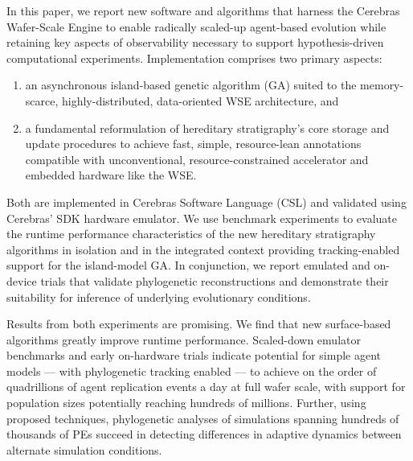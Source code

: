 In this paper, we report new software and algorithms that harness the Cerebras Wafer-Scale Engine to enable radically scaled-up agent-based evolution while retaining key aspects of observability necessary to support hypothesis-driven computational experiments.
Implementation comprises two primary aspects:
\begin{enumerate}
  \item an asynchronous island-based genetic algorithm (GA) suited to the memory-scarce, highly-distributed, data-oriented WSE architecture, and
  \item a fundamental reformulation of hereditary stratigraphy's core storage and update procedures to achieve fast, simple, resource-lean annotations compatible with unconventional, resource-constrained accelerator and embedded hardware like the WSE.
\end{enumerate}

Both are implemented in Cerebras Software Language (CSL) and validated using Cerebras' SDK hardware emulator.
We use benchmark experiments to evaluate the runtime performance characteristics of the new hereditary stratigraphy algorithms in isolation and in the integrated context providing tracking-enabled support for the island-model GA.
In conjunction, we report emulated and on-device trials that validate phylogenetic reconstructions and demonstrate their suitability for inference of underlying evolutionary conditions.

Results from both experiments are promising.
We find that new surface-based algorithms greatly improve runtime performance.
Scaled-down emulator benchmarks and early on-hardware trials indicate potential for simple agent models --- with phylogenetic tracking enabled --- to achieve on the order of quadrillions of agent replication events a day at full wafer scale, with support for population sizes potentially reaching hundreds of millions.
Further, using proposed techniques, phylogenetic analyses of simulations spanning hundreds of thousands of PEs succeed in detecting differences in adaptive dynamics between alternate simulation conditions.

